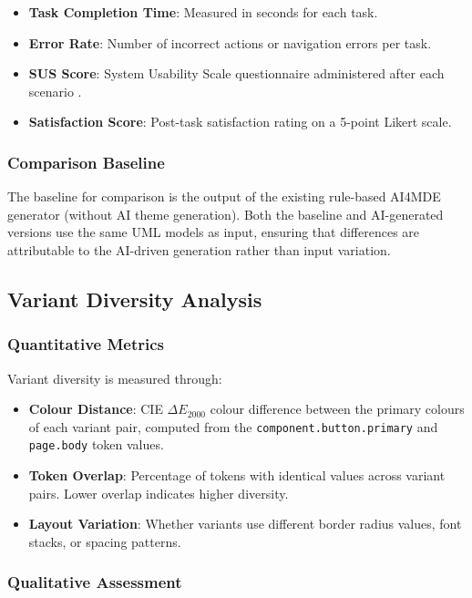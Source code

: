 \begin{itemize}
    \item \textbf{Task Completion Time}: Measured in seconds for each task.
    \item \textbf{Error Rate}: Number of incorrect actions or navigation errors per task.
    \item \textbf{SUS Score}: System Usability Scale questionnaire administered after each scenario \cite{vD24}.
    \item \textbf{Satisfaction Score}: Post-task satisfaction rating on a 5-point Likert scale.
\end{itemize}

\subsubsection{Comparison Baseline}

The baseline for comparison is the output of the existing rule-based AI4MDE generator (without AI theme generation). Both the baseline and AI-generated versions use the same UML models as input, ensuring that differences are attributable to the AI-driven generation rather than input variation.


\subsection{Variant Diversity Analysis}

\subsubsection{Quantitative Metrics}

Variant diversity is measured through:

\begin{itemize}
    \item \textbf{Colour Distance}: CIE $\Delta E_{2000}$ colour difference between the primary colours of each variant pair, computed from the \texttt{component.button.primary} and \texttt{page.body} token values.
    \item \textbf{Token Overlap}: Percentage of tokens with identical values across variant pairs. Lower overlap indicates higher diversity.
    \item \textbf{Layout Variation}: Whether variants use different border radius values, font stacks, or spacing patterns.
\end{itemize}

\subsubsection{Qualitative Assessment}

